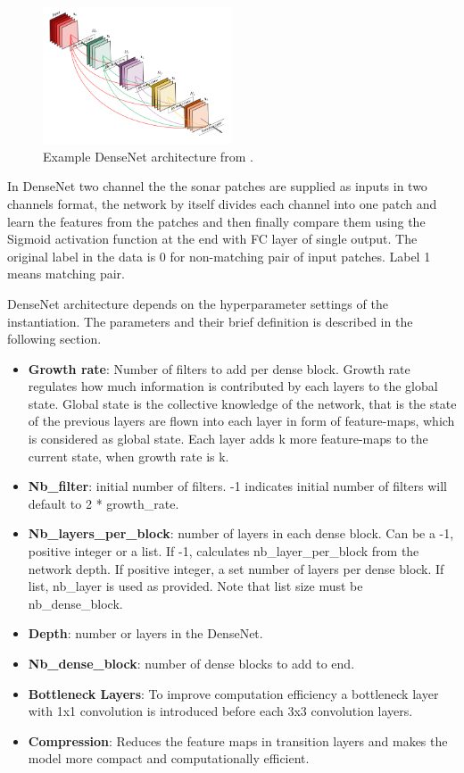 \begin{figure}[ht]
\centering
\includegraphics[width=0.5\textwidth]{images/densenet/densenet.png}
\caption{Example DenseNet architecture from \cite{densenet}.}
\label{fig:densenet}
\end{figure}

In DenseNet two channel the the sonar patches are supplied as inputs in two channels format, the network by itself divides each channel into one patch and learn the features from the patches and then finally compare them using the Sigmoid 
activation function at the end with FC layer of single output. The original label in the data is 0 for non-matching pair of input patches. Label 1 means matching pair.

DenseNet architecture depends on the hyperparameter settings of the instantiation. The parameters and their brief definition is described in the following section. 
\begin{itemize}
  \item \textbf{Growth rate}: Number of filters to add per dense block. Growth rate regulates how much information is contributed by each layers to the global state. 
  Global state is the collective knowledge of the network, that is the state of the previous layers are flown into each layer in form of feature-maps, 
  which is considered as global state. Each layer adds k more feature-maps to the current state, when growth rate is k.

  \item \textbf{Nb\_filter}: initial number of filters. -1 indicates initial number of filters will default to 2 * growth\_rate.

  \item \textbf{Nb\_layers\_per\_block}: number of layers in each dense block. Can be a -1, positive integer or a list. If -1, calculates nb\_layer\_per\_block from the network depth. 
  If positive integer, a set number of layers per dense block. If list, nb\_layer is used as provided. Note that list size must be nb\_dense\_block.

  \item \textbf{Depth}: number or layers in the DenseNet.

  \item \textbf{Nb\_dense\_block}: number of dense blocks to add to end.

  \item \textbf{Bottleneck Layers}: To improve computation efficiency a bottleneck layer with 1x1 convolution is introduced before each 3x3 convolution layers. 
  \item \textbf{Compression}: Reduces the feature maps in transition layers and makes the model more compact and computationally efficient.
\end{itemize}

